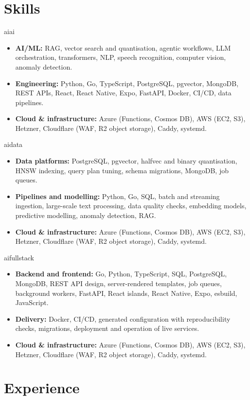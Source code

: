 \documentclass[11pt, a4paper]{article}
\def\variant{ai}
\newcommand{\AI}[1]{\ifx\variant\VAI#1\fi}
\newcommand{\DATA}[1]{\ifx\variant\VDATA#1\fi}
\newcommand{\FULL}[1]{\ifx\variant\VFULL#1\fi}
\def\VAI{ai}
\def\VDATA{data}
\def\VFULL{fullstack}
\begin{document}
\section{Skills}

\AI{
\begin{itemize}
\item \textbf{AI/ML:} RAG, vector search and quantisation, agentic workflows, LLM orchestration, transformers, NLP, speech recognition, computer vision, anomaly detection.
\item \textbf{Engineering:} Python, Go, TypeScript, PostgreSQL, pgvector, MongoDB, REST APIs, React, React Native, Expo, FastAPI, Docker, CI/CD, data pipelines.
\item \textbf{Cloud \& infrastructure:} Azure (Functions, Cosmos DB), AWS (EC2, S3), Hetzner, Cloudflare (WAF, R2 object storage), Caddy, systemd.
\end{itemize}
}

\DATA{
\begin{itemize}
\item \textbf{Data platforms:} PostgreSQL, pgvector, halfvec and binary quantisation, HNSW indexing, query plan tuning, schema migrations, MongoDB, job queues.
\item \textbf{Pipelines and modelling:} Python, Go, SQL, batch and streaming ingestion, large-scale text processing, data quality checks, embedding models, predictive modelling, anomaly detection, RAG.
\item \textbf{Cloud \& infrastructure:} Azure (Functions, Cosmos DB), AWS (EC2, S3), Hetzner, Cloudflare (WAF, R2 object storage), Caddy, systemd.
\end{itemize}
}

\FULL{
\begin{itemize}
\item \textbf{Backend and frontend:} Go, Python, TypeScript, SQL, PostgreSQL, MongoDB, REST API design, server-rendered templates, job queues, background workers, FastAPI, React islands, React Native, Expo, esbuild, JavaScript.
\item \textbf{Delivery:} Docker, CI/CD, generated configuration with reproducibility checks, migrations, deployment and operation of live services.
\item \textbf{Cloud \& infrastructure:} Azure (Functions, Cosmos DB), AWS (EC2, S3), Hetzner, Cloudflare (WAF, R2 object storage), Caddy, systemd.
\end{itemize}
}

\section{Experience}
\end{document}

